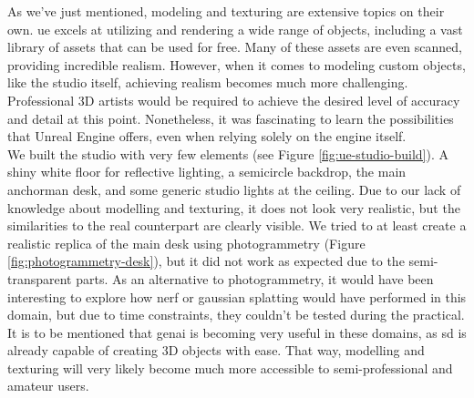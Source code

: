 \documentclass[
  a4paper,  %
  twoside,  %
  bibliography=totoc,
  headsepline,
  cleardoublepage=empty,
  parskip=half,
  draft=false
]{scrbook}
\begin{document}
As we've just mentioned, modeling and texturing are extensive topics on their own. \gls{ue} excels at utilizing and rendering a wide range of objects, including a vast library of assets that can be used for free. Many of these assets are even scanned, providing incredible realism. However, when it comes to modeling custom objects, like the studio itself, achieving realism becomes much more challenging. Professional 3D artists would be required to achieve the desired level of accuracy and detail at this point. Nonetheless, it was fascinating to learn the possibilities that Unreal Engine offers, even when relying solely on the engine itself. \\
We built the studio with very few elements (see Figure \ref{fig:ue-studio-build}). A shiny white floor for reflective lighting, a semicircle backdrop, the main anchorman desk, and some generic studio lights at the ceiling. Due to our lack of knowledge about modelling and texturing, it does not look very realistic, but the similarities to the real counterpart are clearly visible. We tried to at least create a realistic replica of the main desk using photogrammetry (Figure \ref{fig:photogrammetry-desk}), but it did not work as expected due to the semi-transparent parts. As an alternative to photogrammetry, it would have been interesting to explore how \gls{nerf} or gaussian splatting would have performed in this domain, but due to time constraints, they couldn’t be tested during the practical. \\
It is to be mentioned that \gls{genai} is becoming very useful in these domains, as \gls{sd} is already capable of creating 3D objects with ease. That way, modelling and texturing will very likely become much more accessible to semi-professional and amateur users.
\end{document}
